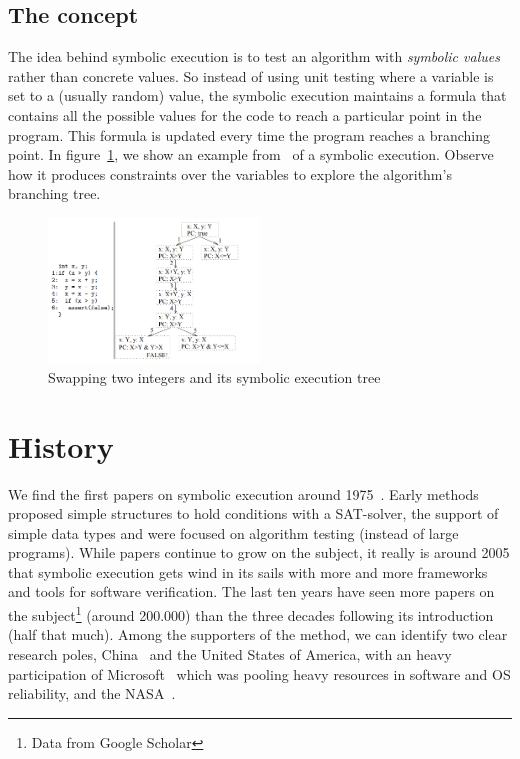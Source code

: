 \documentclass[11pt]{IEEEtran}
\begin{document}
    \subsection{The concept}
      The idea behind symbolic execution is to test an algorithm with \emph{symbolic values} rather than concrete values. So instead of using unit testing where a variable is set to a (usually random) value, the symbolic execution maintains a formula that contains all the possible values for the code to reach a particular point in the program. This formula is updated every time the program reaches a branching point. In figure~\ref{fig:symbolicsimple}, we show an example from~\cite{visserWillemCorina} of a symbolic execution. Observe how it produces constraints over the variables to explore the algorithm's branching tree.
      \begin{figure}
        \includegraphics[width=0.5\textwidth]{symbolicsimple}
        \caption{Swapping two integers and its symbolic execution tree}
        \label{fig:symbolicsimple}
      \end{figure}

  \section{History}
    We find the first papers on symbolic execution around 1975~\cite{newapproach}. Early methods proposed simple structures to hold conditions with a SAT-solver, the support of simple data types and were focused on algorithm testing (instead of large programs). While papers continue to grow on the subject, it really is around 2005 that symbolic execution gets wind in its sails with more and more frameworks and tools for software verification. The last ten years have seen more papers on the subject\footnote{Data from Google Scholar} (around 200.000) than the three decades following its introduction (half that much). Among the supporters of the method, we can identify two clear research poles, China~\cite{Hardware, memorytablemodel, CHEN2018118} and the United States of America, with an heavy participation of Microsoft~\cite{bouncer-securing-software-by-blocking-bad-input} which was pooling heavy resources in software and OS reliability, and the NASA~\cite{neurosymbolicexecution, DirectedIncrementalSymExe, visserWillemCorina}.
\end{document}
